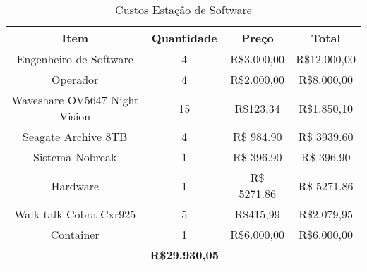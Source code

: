 \begin{table}[]
\centering
\caption{Custos Estação de Software}
\label{tab:custosSoftware}
\begin{tabular}{|c|c|c|c|}
\hline
\rowcolor[HTML]{FFFFFF} 
{\color[HTML]{000000} \textbf{Item}} & \textbf{Quantidade} & \textbf{Preço} & \textbf{Total}        \\ \hline
Engenheiro de Software               & 4                   & R\$3.000,00    & R\$12.000,00          \\ \hline
Operador                             & 4                   & R\$2.000,00    & R\$8.000,00           \\ \hline
Waveshare OV5647 Night Vision        & 15                  & R\$123,34      & R\$1.850,10           \\ \hline
Seagate Archive 8TB                  & 4                   & R\$ 984.90     & R\$ 3939.60           \\ \hline
Sistema Nobreak                      & 1                   & R\$ 396.90     & R\$ 396.90            \\ \hline
Hardware                             & 1                   & R\$ 5271.86    & R\$ 5271.86           \\ \hline
Walk talk Cobra Cxr925               & 5                   & R\$415,99      & R\$2.079,95           \\ \hline
Container                            & 1                   & R\$6.000,00    & R\$6.000,00           \\ \hline
\rowcolor[HTML]{C0C0C0} 
\multicolumn{3}{|c|}{\cellcolor[HTML]{C0C0C0}\textbf{Total}}                & \textbf{R\$29.930,05} \\ \hline
\end{tabular}
\end{table}

